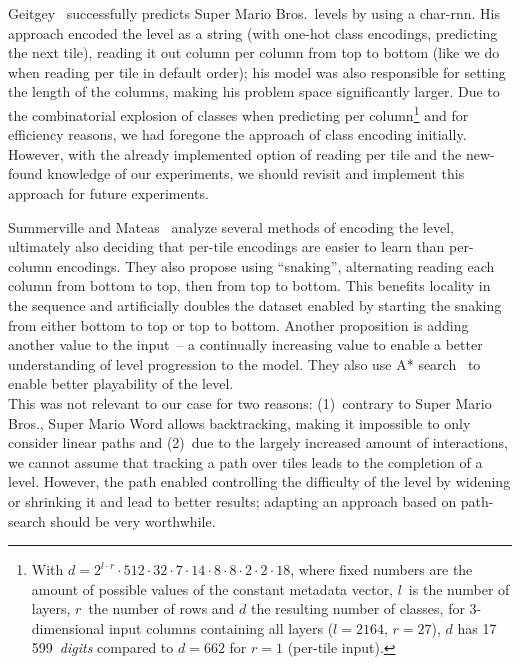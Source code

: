 Geitgey~\cite{geitgeyMachineLearningFun2018} successfully predicts
Super Mario Bros.\ levels by using a char-rnn. His approach encoded
the level as a string (with one-hot class encodings, predicting the
next tile), reading it out column per column from top to bottom (like
we do when reading per tile in default order); his model was also
responsible for setting the length of the columns, making his problem
space significantly larger. Due to the combinatorial explosion of
classes when predicting per column\footnote{With
  $d = 2^{l \cdot r} \cdot 512 \cdot 32 \cdot 7 \cdot 14 \cdot 8 \cdot 8 \cdot 2 \cdot 2 \cdot 18$, where
  fixed numbers are the amount of possible values of the constant
  metadata vector, $l$~is the number of layers, $r$~the number of rows
  and $d$ the resulting number of classes, for 3-dimensional input
  columns containing all layers ($l = 2164$, $r = 27$), $d$ has
  17\,599~\emph{digits} compared to $d = 662$ for $r = 1$ (per-tile
  input).} and for efficiency reasons, we had foregone the approach of
class encoding initially. However, with the already implemented option
of reading per tile and the new-found knowledge of our experiments, we
should revisit and implement this approach for future experiments.

Summerville and Mateas~\cite{summervilleSuperMarioString2016} analyze
several methods of encoding the level, ultimately also deciding that
per-tile encodings are easier to learn than per-column encodings. They
also propose using ``snaking'', alternating reading each column from
bottom to top, then from top to bottom. This benefits locality in the
sequence and artificially doubles the dataset enabled by starting the
snaking from either bottom to top or top to bottom. Another
proposition is adding another value to the input~-- a continually
increasing value to enable a better understanding of level progression
to the model. They also use A* search~\cite{SearchAlgorithm2019}
to enable better playability of the level. \\
This was not relevant to our case for two reasons: (1)~contrary to
Super Mario Bros., Super Mario Word allows backtracking, making it
impossible to only consider linear paths and (2)~due to the largely
increased amount of interactions, we cannot assume that tracking a
path over tiles leads to the completion of a level. However, the path
enabled controlling the difficulty of the level by widening or
shrinking it and lead to better results; adapting an approach based on
path-search should be very worthwhile.


